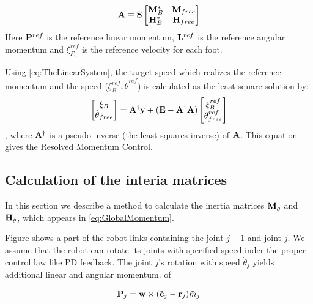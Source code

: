 \begin{equation}
{\bf A} \equiv {\bf S}
\left[
\begin{matrix}
{\bf M}^*_B & {\bf M}_{free}\\
{\bf H}^*_B & {\bf H}_{free}\\
\end{matrix}
\right]
\end{equation}
Here ${\bf P}^{ref}$ is the reference linear momentum,
${\bf L}^{ref}$ is the reference angular momentum and
$\xi^{ref}_{F_i}$ is the reference velocity for each foot.
\par
Using \ref{eq:TheLinearSystem}, the target speed which realizes the
reference momentum and the speed ($\xi^{ref}_B, \dot{\theta}^{ref}$)
is calculated as the least square solution by:
\begin{equation}
\left[
\begin{matrix}
\xi_B \\
\dot{\bf \theta}_{free}
\end{matrix}
\right]
=
{\bf A}^{\dagger}{\bf y}
+ ({\bf E} - {\bf A}^{\dagger}{\bf A})
\left[
\begin{matrix}
\xi_B^{ref} \\
\dot{\bf \theta}_{free}^{ref}\\
\end{matrix}
\right]
\end{equation},
where ${\bf A}^{\dagger}$ is a pseudo-inverse (the least-squares inverse) of
${\bf A}$. This equation gives the Resolved Momentum Control.


\subsection{Calculation of the interia matrices}
In this section we describe a method to calculate the inertia matrices
${\bf M}_{\dot{\theta}}$ and ${\bf H}_{\dot{\theta}}$, which appears
in \ref{eq:GlobalMomentum}.
\par
Figure
shows a part of the robot links containing the joint $j-1$ and joint $j$.
We assume that the robot can rotate its joints with specified speed inder the
proper control law like PD feedback. The joint $j$'s rotation with speed
$\dot{\theta}_j$ yields additional linear and angular momentum. of

\begin{equation}
\begin{aligned}
{\bf P}_j &= {\bf w} \times ( \tilde{\bf c}_j - {\bf r}_j ) \tilde{m}_j \\
\end{aligned}
\label{eq:IterativeLinearMomentum}
\end{equation}

